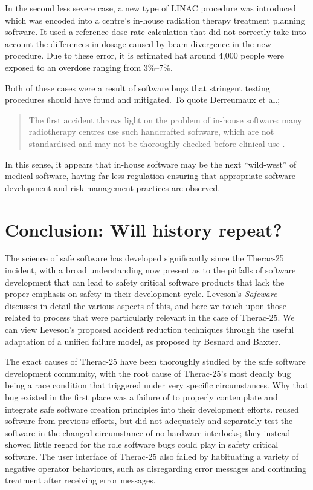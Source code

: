 \documentclass{cshonours}
\newcommand{\ther}{Therac-25\xspace}
\newcommand{\etal}{et al.\xspace}
\begin{document}
In the second less severe case, a new type of LINAC procedure was introduced which was encoded into a centre's in-house radiation therapy treatment planning software. It used a reference dose rate calculation that did not correctly take into account the differences in dosage caused by beam divergence in the new procedure. Due to these error, it is estimated hat around 4,000 people were exposed to an overdose ranging from 3\%--7\%.

Both of these cases were a result of software bugs that stringent testing procedures should have found and mitigated. To quote Derreumaux \etal;
\begin{quote}
The first accident throws light on the problem of in-house software: many radiotherapy centres use such handcrafted software, which are not standardised and may not be thoroughly checked before clinical use \cite{derreumaux2008lessons}.
\end{quote}

In this sense, it appears that in-house software may be the next ``wild-west'' of medical software, having far less regulation ensuring that appropriate software development and risk management practices are observed. 



\chapter{Conclusion: Will history repeat?}
\label{chap:conclusion}
The science of safe software has developed significantly since the \ther incident, with a broad understanding now present as to the pitfalls of software development that can lead to safety critical software products that lack the proper emphasis on safety in their development cycle. Leveson's \textit{Safeware} discusses in detail the various aspects of this, and here we touch upon those related to process that were particularly relevant in the case of \ther. We can view Leveson's proposed accident reduction techniques through the useful adaptation of a unified failure model, as proposed by Besnard and Baxter.

The exact causes of \ther have been thoroughly studied by the safe software development community, with the root cause of \ther's most deadly bug being a race condition that triggered under very specific circumstances. Why that bug existed in the first place was a failure of \aecl to properly contemplate and integrate safe software creation principles into their development efforts. \aecl reused software from previous efforts, but did not adequately and separately test the software in the changed circumstance of no hardware interlocks; they instead showed little regard for the role software bugs could play in safety critical software. The user interface of \ther also failed by habituating a variety of negative operator behaviours, such as disregarding error messages and continuing treatment after receiving error messages.
\end{document}
